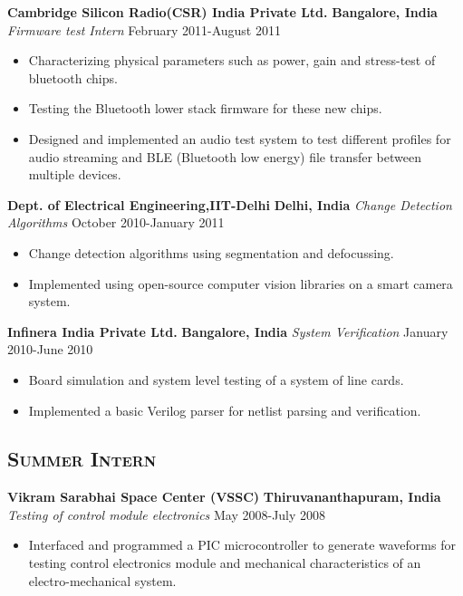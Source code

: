 \documentclass[10pt]{article}
\begin{document}
\textbf{Cambridge Silicon Radio(CSR) India Private Ltd.} \hfill \textbf{Bangalore, India} \newline
\textit{Firmware test Intern} \hfill February 2011-August 2011
\begin{itemize}
\item Characterizing physical parameters such as power, gain and stress-test of bluetooth chips.
\item Testing the Bluetooth lower stack firmware for these new chips.
\item Designed and implemented an audio test system to test different profiles for audio streaming and BLE (Bluetooth low energy) file transfer between multiple devices.
\end{itemize}

\noindent \textbf{Dept. of Electrical Engineering,IIT-Delhi} \hfill \textbf{Delhi, India}  \newline
\textit{Change Detection Algorithms} \hfill October 2010-January 2011
\begin{itemize}
\item Change detection algorithms using segmentation and defocussing.
\item Implemented using open-source computer vision libraries on a smart camera system.
\end{itemize}

\noindent \textbf{Infinera India Private Ltd.} \hfill \textbf{Bangalore, India} \newline
\textit{System Verification} \hfill January 2010-June 2010
\begin{itemize}
\item Board simulation and system level testing of a system of line cards.
\item Implemented a basic Verilog parser for netlist parsing and verification.
\end{itemize}

\subsection*{\textsc{\large Summer Intern}}
\textbf{Vikram Sarabhai Space Center (VSSC)} \hfill \textbf{Thiruvananthapuram, India} \newline 
\textit{Testing of control module electronics} \hfill May 2008-July 2008
\begin{itemize}
\item Interfaced and programmed a PIC microcontroller to generate waveforms for testing control electronics module and mechanical characteristics of an electro-mechanical system.
\end{itemize}
\end{document}
